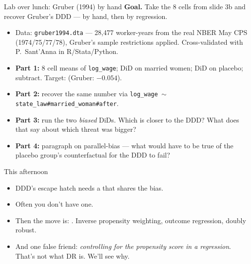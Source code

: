 \documentclass[aspectratio=169,11pt]{beamer}
\begin{document}
\begin{frame}{Lab over lunch: Gruber (1994) by hand}
\textbf{Goal.} Take the 8 cells from slide 3b and recover Gruber's DDD --- by hand, then by regression.
\vspace{0.3em}
\begin{itemize}\small
  \item Data: \texttt{gruber1994.dta} --- 28{,}477 worker-years from the real NBER May CPS (1974/75/77/78), Gruber's sample restrictions applied. Cross-validated with P.\ Sant'Anna in R/Stata/Python.
  \item \textbf{Part 1:} 8 cell means of \texttt{log\_wage}; DiD on married women; DiD on placebo; subtract. Target:  (Gruber: $-0.054$).
  \item \textbf{Part 2:} recover the same number via \texttt{log\_wage $\sim$ state\_law\#married\_woman\#after}.
  \item \textbf{Part 3:} run the two \textit{biased} DiDs. Which is closer to the DDD? What does that say about which threat was bigger?
  \item \textbf{Part 4:} paragraph on parallel-bias --- what would have to be true of the placebo group's counterfactual for the DDD to fail?
\end{itemize}
\vspace{0.3em}
\end{frame}

\begin{frame}{This afternoon}
\vspace{0.4em}
\begin{itemize}
  \item DDD's escape hatch needs a  that shares the bias.
  \item Often you don't have one.
  \item Then the move is: . Inverse propensity weighting, outcome regression, doubly robust.
  \item And one false friend: \textit{controlling for the propensity score in a regression}. That's not what DR is. We'll see why.
\end{itemize}
\end{frame}
\end{document}
